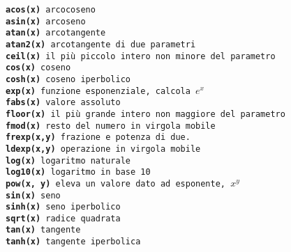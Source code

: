 \documentclass[11pt]{article}
\begin{document}
\begin{mdframed}[backgroundcolor=panna]
\texttt{{\bf acos(x)}	arcocoseno
\\
{\bf asin(x)}	arcoseno
\\
{\bf atan(x)}	arcotangente
\\
{\bf atan2(x)}	arcotangente di due parametri
\\
{\bf ceil(x)}	il più piccolo intero non minore del parametro
\\
{\bf cos(x)}	coseno
\\
{\bf cosh(x)}	coseno iperbolico
\\
{\bf exp(x)}	funzione esponenziale, calcola $e^x$
\\
{\bf fabs(x)}	valore assoluto
\\
{\bf floor(x)}	il più grande intero non maggiore del parametro
\\
{\bf fmod(x)}	resto del numero in virgola mobile
\\
{\bf frexp(x,y)}	frazione e potenza di due.
\\
{\bf ldexp(x,y)}	operazione in virgola mobile
\\
{\bf log(x)}	logaritmo naturale
\\
{\bf log10(x)}	logaritmo in base 10
\\
{\bf pow(x, y)}	eleva un valore dato ad esponente, $x^y$
\\
{\bf sin(x)}	seno
\\
{\bf sinh(x)}	seno iperbolico
\\
{\bf sqrt(x)}	radice quadrata
\\
{\bf tan(x)}       tangente
\\
{\bf tanh(x)}	tangente iperbolica
}
\end{mdframed}
\end{document}
